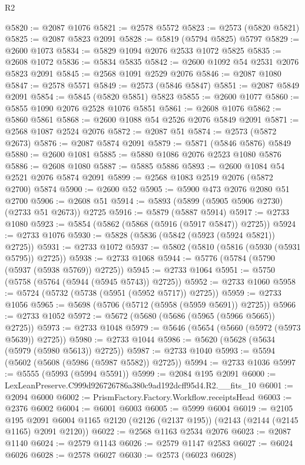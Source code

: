 \begin{lexlean}{R2}
\begin{coremodule}
@5820 := @2087 @1076
@5821 := @2578 @5572
@5823 := @2573 (@5820 @5821)
@5825 := @2087 @5823 @2091
@5828 := @5819 (@5794 @5825) @5797
@5829 := @2600 @1073
@5834 := @5829 @1094 @2076 @2533 @1072 @5825
@5835 := @2608 @1072
@5836 := @5834 @5835
@5842 := @2600 @1092 @54 @2531 @2076 @5823 @2091
@5845 := @2568 @1091 @2529 @2076
@5846 := @2087 @1080
@5847 := @2578 @5571
@5849 := @2573 (@5846 @5847)
@5851 := @2087 @5849 @2091
@5854 := @5845 (@5820 @5851) @5823
@5855 := @2600 @1077
@5860 := @5855 @1090 @2076 @2528 @1076 @5851
@5861 := @2608 @1076
@5862 := @5860 @5861
@5868 := @2600 @1088 @54 @2526 @2076 @5849 @2091
@5871 := @2568 @1087 @2524 @2076
@5872 := @2087 @51
@5874 := @2573 (@5872 @2673)
@5876 := @2087 @5874 @2091
@5879 := @5871 (@5846 @5876) @5849
@5880 := @2600 @1081
@5885 := @5880 @1086 @2076 @2523 @1080 @5876
@5886 := @2608 @1080
@5887 := @5885 @5886
@5893 := @2600 @1084 @54 @2521 @2076 @5874 @2091
@5899 := @2568 @1083 @2519 @2076 (@5872 @2700) @5874
@5900 := @2600 @52
@5905 := @5900 @473 @2076 @2080 @51 @2700
@5906 := @2608 @51
@5914 := @5893 (@5899 (@5905 @5906 @2730) (@2733 @51 @2673)) @2725
@5916 := @5879 (@5887 @5914)
@5917 := @2733 @1080
@5923 := @5854 (@5862 (@5868 (@5916 (@5917 @5847)) @2725))
@5924 := @2733 @1076
@5930 := @5828 (@5836 (@5842 (@5923 (@5924 @5821)) @2725))
@5931 := @2733 @1072
@5937 := @5802 (@5810 (@5816 (@5930 (@5931 @5795)) @2725))
@5938 := @2733 @1068
@5944 := @5776 (@5784 (@5790 (@5937 (@5938 @5769)) @2725))
@5945 := @2733 @1064
@5951 := @5750 (@5758 (@5764 (@5944 (@5945 @5743)) @2725))
@5952 := @2733 @1060
@5958 := @5724 (@5732 (@5738 (@5951 (@5952 @5717)) @2725))
@5959 := @2733 @1056
@5965 := @5698 (@5706 (@5712 (@5958 (@5959 @5691)) @2725))
@5966 := @2733 @1052
@5972 := @5672 (@5680 (@5686 (@5965 (@5966 @5665)) @2725))
@5973 := @2733 @1048
@5979 := @5646 (@5654 (@5660 (@5972 (@5973 @5639)) @2725))
@5980 := @2733 @1044
@5986 := @5620 (@5628 (@5634 (@5979 (@5980 @5613)) @2725))
@5987 := @2733 @1040
@5993 := @5594 (@5602 (@5608 (@5986 (@5987 @5582)) @2725))
@5994 := @2733 @1036
@5997 := @5555 (@5993 (@5994 @5591))
@5999 := @2084 @195 @2091
@6000 := LexLeanPreserve.C999d926726786a380c9ad192dcff95d4.R2.__fits_10
@6001 := @2094 @6000
@6002 := PrismFactory.Factory.Workflow.receiptsHead
@6003 := @2376 @6002
@6004 := @6001 @6003
@6005 := @5999 @6004
@6019 := @2105
    @195
    @2091
    @6004
    @1165
    @2120
    (@2126 (@2137 @195))
    (@2143 (@2144 (@2145 @1165) @2091 @2120))
@6022 := @2568 @1163 @2534 @2076
@6023 := @2087 @1140
@6024 := @2579 @1143
@6026 := @2579 @1147 @2583
@6027 := @6024 @6026
@6028 := @2578 @6027
@6030 := @2573 (@6023 @6028)

\end{coremodule}
\end{lexlean}

